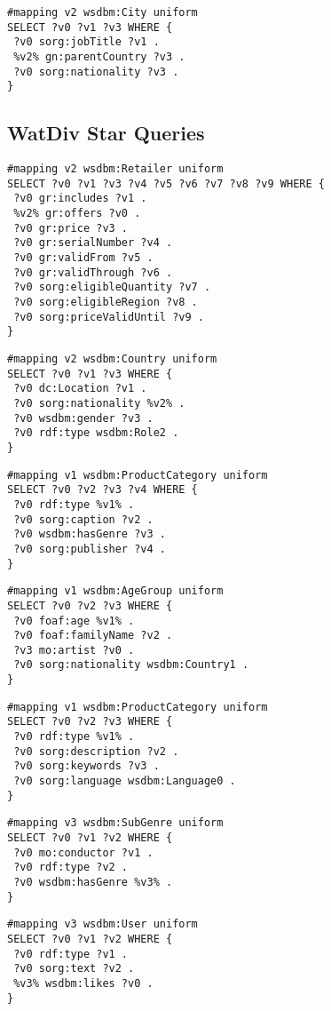 \begin{lstlisting}[caption={L5},label=query:L5]
#mapping v2 wsdbm:City uniform
SELECT ?v0 ?v1 ?v3 WHERE {
 ?v0 sorg:jobTitle ?v1 .
 %v2% gn:parentCountry ?v3 .
 ?v0 sorg:nationality ?v3 .
}
\end{lstlisting}

\subsection{WatDiv Star Queries} 

\begin{lstlisting}[caption={S1},label=query:S1]
#mapping v2 wsdbm:Retailer uniform
SELECT ?v0 ?v1 ?v3 ?v4 ?v5 ?v6 ?v7 ?v8 ?v9 WHERE {
 ?v0 gr:includes ?v1 .
 %v2% gr:offers ?v0 .
 ?v0 gr:price ?v3 .
 ?v0 gr:serialNumber ?v4 .
 ?v0 gr:validFrom ?v5 .
 ?v0 gr:validThrough ?v6 .
 ?v0 sorg:eligibleQuantity ?v7 .
 ?v0 sorg:eligibleRegion ?v8 .
 ?v0 sorg:priceValidUntil ?v9 .
}
\end{lstlisting}

\begin{lstlisting}[caption={S2},label=query:S2]
#mapping v2 wsdbm:Country uniform
SELECT ?v0 ?v1 ?v3 WHERE {
 ?v0 dc:Location ?v1 .
 ?v0 sorg:nationality %v2% .
 ?v0 wsdbm:gender ?v3 .
 ?v0 rdf:type wsdbm:Role2 .
}
\end{lstlisting}

\begin{lstlisting}[caption={S3},label=query:S3]
#mapping v1 wsdbm:ProductCategory uniform
SELECT ?v0 ?v2 ?v3 ?v4 WHERE {
 ?v0 rdf:type %v1% .
 ?v0 sorg:caption ?v2 .
 ?v0 wsdbm:hasGenre ?v3 .
 ?v0 sorg:publisher ?v4 .
}
\end{lstlisting}

\begin{lstlisting}[caption={S4},label=query:S4]
#mapping v1 wsdbm:AgeGroup uniform
SELECT ?v0 ?v2 ?v3 WHERE {
 ?v0 foaf:age %v1% .
 ?v0 foaf:familyName ?v2 .
 ?v3 mo:artist ?v0 .
 ?v0 sorg:nationality wsdbm:Country1 .
}
\end{lstlisting}

\begin{lstlisting}[caption={S5},label=query:S5]
#mapping v1 wsdbm:ProductCategory uniform
SELECT ?v0 ?v2 ?v3 WHERE {
 ?v0 rdf:type %v1% .
 ?v0 sorg:description ?v2 .
 ?v0 sorg:keywords ?v3 .
 ?v0 sorg:language wsdbm:Language0 .
}
\end{lstlisting}

\begin{lstlisting}[caption={S6},label=query:S6]
#mapping v3 wsdbm:SubGenre uniform
SELECT ?v0 ?v1 ?v2 WHERE {
 ?v0 mo:conductor ?v1 .
 ?v0 rdf:type ?v2 .
 ?v0 wsdbm:hasGenre %v3% .
}
\end{lstlisting}

\begin{lstlisting}[caption={S7},label=query:S7]
#mapping v3 wsdbm:User uniform
SELECT ?v0 ?v1 ?v2 WHERE {
 ?v0 rdf:type ?v1 .
 ?v0 sorg:text ?v2 .
 %v3% wsdbm:likes ?v0 .
}
\end{lstlisting}
